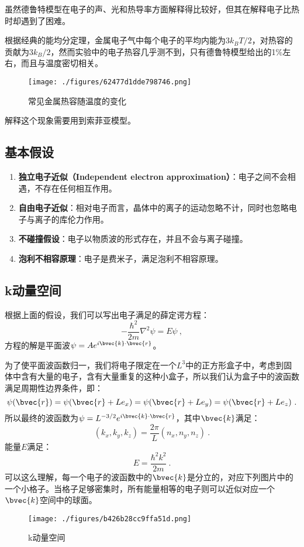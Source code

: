 

虽然德鲁特模型在电子的声、光和热导率方面解释得比较好，但其在解释电子比热时却遇到了困难。

根据经典的能均分定理，金属电子气中每个电子的平均内能为$3k_BT/2$，对热容的贡献为$3k_B/2$，然而实验中的电子热容几乎测不到，只有德鲁特模型给出的1\%左右，而且与温度密切相关。
\begin{figure}[ht]
\centering
\texttt{[image: ./figures/62477d1dde798746.png]}
\caption{常见金属热容随温度的变化} \label{fig_SMFM_1}
\end{figure}
解释这个现象需要用到索菲亚模型。
\subsection{基本假设}
\begin{enumerate}
\item \textbf{独立电子近似（Independent electron approximation）}：电子之间不会相遇，不存在任何相互作用。
\item \textbf{自由电子近似}：相对电子而言，晶体中的离子的运动忽略不计，同时也忽略电子与离子的库伦力作用。
\item \textbf{不碰撞假设}：电子以物质波的形式存在，并且不会与离子碰撞。
\item \textbf{泡利不相容原理}：电子是费米子，满足泡利不相容原理。
\end{enumerate}
\subsection{k动量空间}
根据上面的假设，我们可以写出电子满足的薛定谔方程：
\begin{equation}
-\frac{\hbar^2}{2m}\nabla^2\psi=E\psi~,
\end{equation}
方程的解是平面波$\psi=Ae^{i\bvec{k}\cdot \bvec{r}}$。

为了使平面波函数归一，我们将电子限定在一个$L^3$中的正方形盒子中，考虑到固体中含有大量的电子，含有大量重复的这种小盒子，所以我们认为盒子中的波函数满足周期性边界条件，即：
\begin{equation}
\psi(\bvec{r})=\psi(\bvec{r}+Le_x)=\psi(\bvec{r}+Le_y)=\psi(\bvec{r}+Le_z)~.
\end{equation}
所以最终的波函数为$\psi=L^{-3/2}e^{i\bvec{k}\cdot \bvec{r}}$，其中$\bvec{k}$满足：
\begin{equation}
\left (k_x, k_y, k_z\right )=\frac{2\pi}{L}\left(n_x, n_y, n_z\right )~.
\end{equation}
能量$E$满足：
\begin{equation}
E=\frac{\hbar ^2 k^2}{2m}~.
\end{equation}
可以这么理解，每一个电子的波函数中的$\bvec{k}$是分立的，对应下列图片中的一个小格子。当格子足够密集时，所有能量相等的电子则可以近似对应一个$\bvec{k}$空间中的球面。
\begin{figure}[ht]
\centering
\texttt{[image: ./figures/b426b28cc9ffa51d.png]}
\caption{k动量空间} \label{fig_SMFM_2}
\end{figure}
